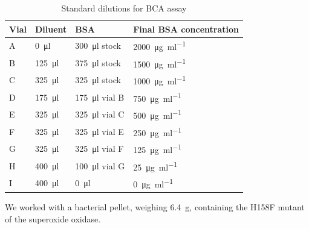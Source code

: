 \documentclass[a4paper]{scrreprt}
\begin{document}
\begin{table}
	\centering
	\begin{tabu}{llll}
		\toprule Vial & Diluent & BSA & Final BSA concentration \\
		\midrule
		A & \SI{0}{\ul}   & \SI{300}{\ul} stock  & \SI{2000}{\ug\per\ml} \\
		B & \SI{125}{\ul} & \SI{375}{\ul} stock  & \SI{1500}{\ug\per\ml} \\
		C & \SI{325}{\ul} & \SI{325}{\ul} stock  & \SI{1000}{\ug\per\ml} \\
		D & \SI{175}{\ul} & \SI{175}{\ul} vial B & \SI{750}{\ug\per\ml} \\
		E & \SI{325}{\ul} & \SI{325}{\ul} vial C & \SI{500}{\ug\per\ml} \\
		F & \SI{325}{\ul} & \SI{325}{\ul} vial E & \SI{250}{\ug\per\ml} \\
		G & \SI{325}{\ul} & \SI{325}{\ul} vial F & \SI{125}{\ug\per\ml} \\
		H & \SI{400}{\ul} & \SI{100}{\ul} vial G & \SI{25}{\ug\per\ml} \\
		I & \SI{400}{\ul} & \SI{0}{\ul}          & \SI{0}{\ug\per\ml} \\
		\bottomrule
	\end{tabu}
	\caption{Standard dilutions for BCA assay}
	\label{tbl:bca_standard}
\end{table}

We worked with a bacterial pellet, weighing \SI{6.4}{\g}, containing the H158F
mutant of the superoxide oxidase.
\end{document}
